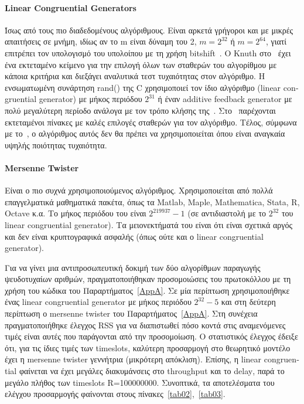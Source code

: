 \documentclass[12pt]{report}
\begin{document}
\paragraph{\textlatin{Linear Congruential Generators}} Ίσως από τους πιο διαδεδομένους αλγόριθμους. Είναι αρκετά γρήγοροι και με μικρές απαιτήσεις σε μνήμη, ιδίως αν το \textlatin{m} είναι δύναμη του 2, \(m=2^{32}\) ή \(m=2^{64}\), γιατί επιτρέπει τον υπολογισμό του υπολοίπου με τη χρήση \textlatin{bitshift}~\cite{wiki:01}. O \textlatin{Knuth} στο~\cite{book:06} έχει ένα εκτεταμένο κείμενο για την επιλογή όλων των σταθερών του αλγορίθμου με κάποια κριτήρια και διεξάγει αναλυτικά τεστ τυχαιότητας στον αλγόριθμο. Η ενσωματωμένη συνάρτηση \textlatin{rand()} της \textlatin{C} χρησιμοποιεί τον ίδιο αλγόριθμο (\textlatin{linear congruential generator}) με μήκος περιόδου \(2^{31}\) ή έναν \textlatin{additive feedback generator} με πολύ μεγαλύτερη περίοδο ανάλογα με τον τρόπο κλήσης της~\cite{wiki:01}. Στο~\cite{paper:11} παρέχονται εκτεταμένοι πίνακες με καλές επιλογές σταθερών για τον αλγόριθμο. Τέλος, σύμφωνα με το~\cite{wiki:01}, ο αλγόριθμος αυτός δεν θα πρέπει να χρησιμοποιείται όπου είναι αναγκαία υψηλής ποιότητας τυχαιότητα.

\paragraph{\textlatin{Mersenne Twister}}
Είναι ο πιο συχνά χρησιμοποιούμενος αλγόριθμος. Χρησιμοποιείται από πολλά επαγγελματικά μαθηματικά πακέτα, όπως τα \textlatin{Matlab, Maple, Mathematica, Stata, R, Octave} κ.α. Το μήκος περιόδου του είναι \(2^{219937}-1\) (σε αντιδιαστολή με το \(2^{32}\) του \textlatin{linear congruential generator}). Τα μειονεκτήματά του είναι ότι είναι σχετικά αργός και δεν είναι κρυπτογραφικά ασφαλής (όπως ούτε και ο \textlatin{linear congruential generator}).

Για να γίνει μια αντιπροσωπευτική δοκιμή των δύο αλγορίθμων παραγωγής ψευδοτυχαίων αριθμών, πραγματοποιήθηκαν προσομοιώσεις του πρωτοκόλλου με τη χρήση του κώδικα του Παραρτήματος~\ref{AppA}. Σε μία περίπτωση χρησιμοποιήθηκε ένας \textlatin{linear congruential generator} με μήκος περιόδου \(2^{32}-5\) και στη δεύτερη περίπτωση ο \textlatin{mersenne twister} του Παραρτήματος~\ref{AppA}. Στη συνέχεια πραγματοποιήθηκε έλεγχος \textlatin{RSS} για να διαπιστωθεί πόσο κοντά στις αναμενόμενες τιμές είναι αυτές που παράγονται από την προσομοίωση. Ο στατιστικός έλεγχος έδειξε ότι, για τις ίδιες τιμές των \textlatin{timeslots}, καλύτερη προσαρμογή στο θεωρητικό μοντέλο έχει η \textlatin{mersenne twister} γεννήτρια (μικρότερη απόκλιση). Επίσης, η \textlatin{linear congruential} φαίνεται να έχει μεγάλες διακυμάνσεις στο \textlatin{throughput} και το \textlatin{delay}, παρά το μεγάλο πλήθος των \textlatin{timeslots R=100000000}. Συνοπτικά, τα αποτελέσματα του ελέγχου προσαρμογής φαίνονται στους πίνακες~\ref{tab02},~\ref{tab03}.
\end{document}
